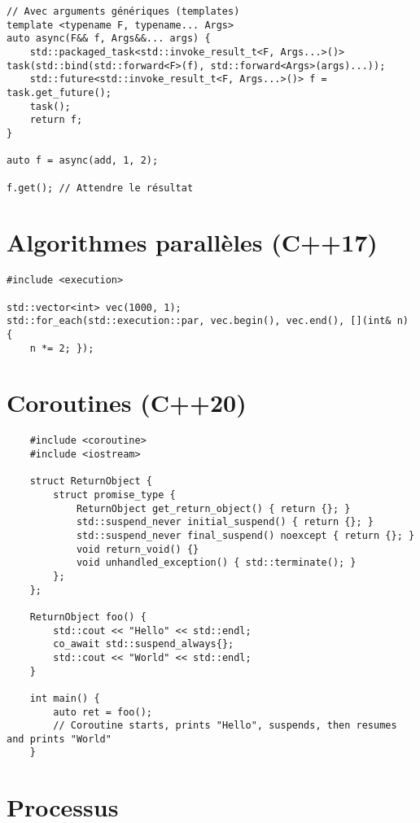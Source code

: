 \documentclass{article}
\begin{document}
\begin{multicols*}{3}
\begin{lstlisting}
// Avec arguments génériques (templates)
template <typename F, typename... Args>
auto async(F&& f, Args&&... args) {
    std::packaged_task<std::invoke_result_t<F, Args...>()> task(std::bind(std::forward<F>(f), std::forward<Args>(args)...));
    std::future<std::invoke_result_t<F, Args...>()> f = task.get_future();
    task();
    return f;
}

auto f = async(add, 1, 2);

f.get(); // Attendre le résultat
\end{lstlisting}

\section*{Algorithmes parallèles (C++17)}

\begin{lstlisting}
#include <execution>

std::vector<int> vec(1000, 1);
std::for_each(std::execution::par, vec.begin(), vec.end(), [](int& n) {
    n *= 2; });
\end{lstlisting}

\section*{Coroutines (C++20)}

\begin{lstlisting}
    #include <coroutine>
    #include <iostream>

    struct ReturnObject {
        struct promise_type {
            ReturnObject get_return_object() { return {}; }
            std::suspend_never initial_suspend() { return {}; }
            std::suspend_never final_suspend() noexcept { return {}; }
            void return_void() {}
            void unhandled_exception() { std::terminate(); }
        };
    };

    ReturnObject foo() {
        std::cout << "Hello" << std::endl;
        co_await std::suspend_always{};
        std::cout << "World" << std::endl;
    }

    int main() {
        auto ret = foo();
        // Coroutine starts, prints "Hello", suspends, then resumes and prints "World"
    }
\end{lstlisting}

\section*{Processus}


\end{multicols*}
\end{document}

